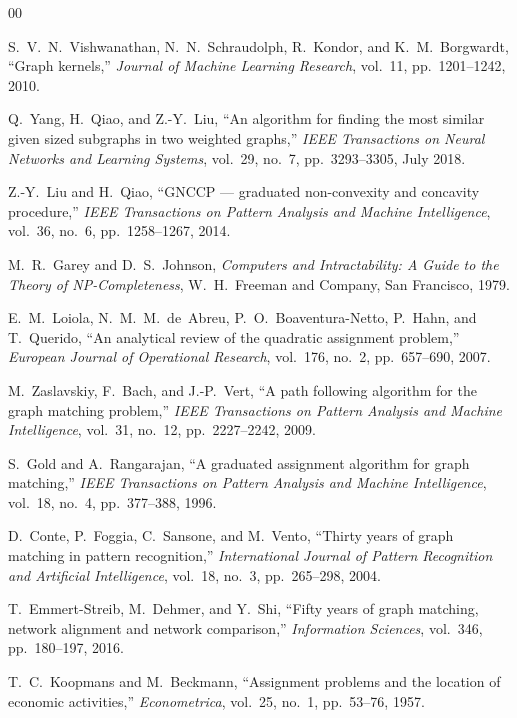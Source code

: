 \documentclass[conference]{IEEEtran}
\begin{document}
\begin{thebibliography}{00}

S.~V.~N.~Vishwanathan, N.~N.~Schraudolph, R.~Kondor, and K.~M.~Borgwardt,
``Graph kernels,''
\textit{Journal of Machine Learning Research},
vol.~11, pp.~1201--1242, 2010.

Q.~Yang, H.~Qiao, and Z.-Y.~Liu,
``An algorithm for finding the most similar given sized subgraphs in two weighted graphs,''
\textit{IEEE Transactions on Neural Networks and Learning Systems},
vol.~29, no.~7, pp.~3293--3305, July 2018.

Z.-Y.~Liu and H.~Qiao,
``GNCCP --- graduated non-convexity and concavity procedure,''
\textit{IEEE Transactions on Pattern Analysis and Machine Intelligence},
vol.~36, no.~6, pp.~1258--1267, 2014.

M.~R.~Garey and D.~S.~Johnson,
\textit{Computers and Intractability: A Guide to the Theory of NP-Completeness},
W.~H.~Freeman and Company, San Francisco, 1979.

E.~M.~Loiola, N.~M.~M.~de~Abreu, P.~O.~Boaventura-Netto, P.~Hahn, and T.~Querido,
``An analytical review of the quadratic assignment problem,''
\textit{European Journal of Operational Research},
vol.~176, no.~2, pp.~657--690, 2007.

M.~Zaslavskiy, F.~Bach, and J.-P.~Vert,
``A path following algorithm for the graph matching problem,''
\textit{IEEE Transactions on Pattern Analysis and Machine Intelligence},
vol.~31, no.~12, pp.~2227--2242, 2009.

S.~Gold and A.~Rangarajan,
``A graduated assignment algorithm for graph matching,''
\textit{IEEE Transactions on Pattern Analysis and Machine Intelligence},
vol.~18, no.~4, pp.~377--388, 1996.

D.~Conte, P.~Foggia, C.~Sansone, and M.~Vento,
``Thirty years of graph matching in pattern recognition,''
\textit{International Journal of Pattern Recognition and Artificial Intelligence},
vol.~18, no.~3, pp.~265--298, 2004.

T.~Emmert-Streib, M.~Dehmer, and Y.~Shi,
``Fifty years of graph matching, network alignment and network comparison,''
\textit{Information Sciences},
vol.~346, pp.~180--197, 2016.

T.~C.~Koopmans and M.~Beckmann,
``Assignment problems and the location of economic activities,''
\textit{Econometrica},
vol.~25, no.~1, pp.~53--76, 1957.


\end{thebibliography}
\end{document}

